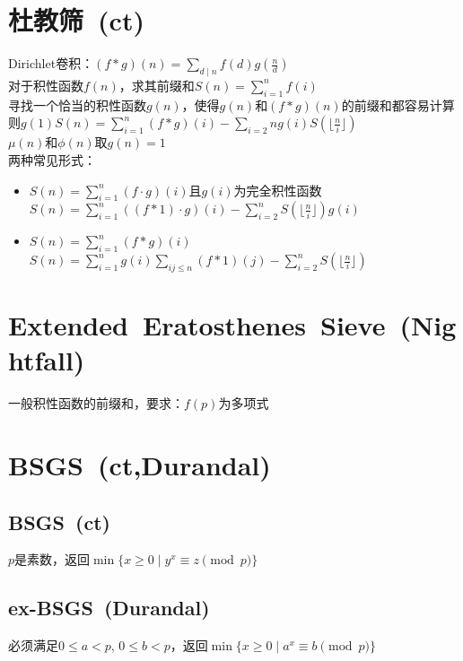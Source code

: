 \section{杜教筛\ \small(ct)}
    \noindent Dirichlet卷积：$ (f \ast g) (n) = \sum\limits_{d \mid n}^{} f(d) g(\frac{n}{d}) $
    \\对于积性函数$ f(n) $，求其前缀和$ S(n) = \sum\limits_{i = 1}^{n} f(i) $
    \\寻找一个恰当的积性函数$ g(n) $，使得$ g(n) $和$ (f \ast g) (n) $的前缀和都容易计算
    \\则$ g(1) S(n) = \sum\limits_{i = 1}^{n} (f \ast g) (i) - \sum\limits_{i = 2}{n} g(i) S(\lfloor \frac{n}{i} \rfloor) $
    \\$ \mu (n) $和$ \phi (n) $取$ g(n) = 1 $
    \\两种常见形式：
    \begin{itemize}[wide=0pt]
        \item $ S(n) = \sum\limits_{i = 1}^{n} (f \cdot g) (i) $且$ g(i) $为完全积性函数
            \\$ S(n) = \sum\limits_{i = 1}^{n} ((f \ast 1) \cdot g) (i) - \sum\limits_{i = 2}^{n} S(\lfloor \frac{n}{i} \rfloor) g(i) $
        \item $ S(n) = \sum\limits_{i = 1}^{n} (f \ast g) (i) $
            \\$ S(n) = \sum\limits_{i = 1}^{n} g (i) \sum\limits_{ij \leq n}^{} (f \ast 1) (j) - \sum\limits_{i = 2}^{n} S(\lfloor \frac{n}{i} \rfloor) $
    \end{itemize}

\section{Extended\ Eratosthenes\ Sieve\ \small(Nightfall)}
    一般积性函数的前缀和，要求：$ f(p) $为多项式

\section{BSGS\ \small(ct,Durandal)}
    \subsection*{BSGS\ \small(ct)}
        $ p $是素数，返回$ \min\lbrace x \geq 0 \mid y^x \equiv z \pmod p \rbrace $
    \subsection*{ex-BSGS\ \small(Durandal)}
        必须满足$ 0 \leq a < p $, $ 0 \leq b < p $，返回$ \min\lbrace x \geq 0 \mid a^x \equiv b \pmod p\rbrace $

